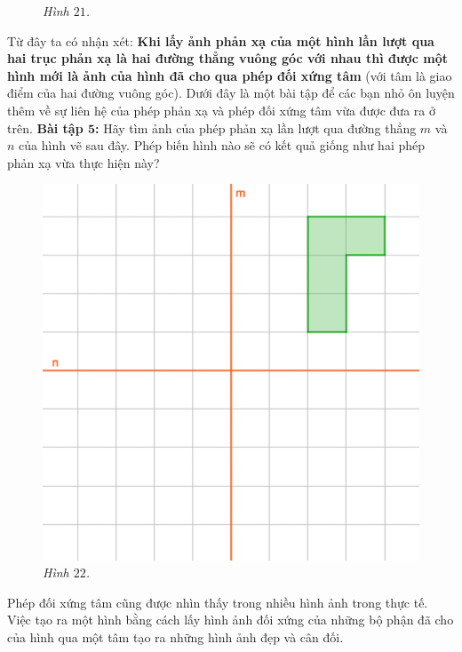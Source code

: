 \begin{multicols}{2}
\begin{figure}[H]
		\caption{\small\textit{\color{toancuabi}Hình $21$.}}
		\vspace*{-10pt}
	\end{figure}
	Từ đây ta có nhận xét: \textbf{\color{toancuabi}Khi lấy ảnh phản xạ của một hình lần lượt qua hai trục phản xạ là hai đường thẳng vuông góc với nhau thì được một hình mới là ảnh của hình đã cho qua phép đối xứng tâm} (với tâm là giao điểm của hai đường vuông góc).
	\vskip 0.1cm
	Dưới đây là một bài tập để các bạn nhỏ ôn luyện thêm về sự liên hệ của phép phản xạ và phép đối xứng tâm vừa được đưa ra ở trên.
	\vskip 0.1cm
	\textbf{\color{toancuabi}Bài tập $\pmb5$:} Hãy tìm ảnh của phép phản xạ lần lượt qua đường thẳng $m$ và $n$ của hình vẽ sau đây. Phép biến hình nào sẽ có kết quả giống như hai phép phản xạ vừa thực hiện này?
	\begin{figure}[H]
		\vspace*{5pt}
		\centering
		\captionsetup{labelformat= empty, justification=centering}
		\includegraphics[width= 1\linewidth]{21}
		\caption{\small\textit{\color{toancuabi}Hình $22$.}}
		\vspace*{-10pt}
	\end{figure}
	Phép đối xứng tâm cũng được nhìn thấy trong nhiều hình ảnh trong thực tế. Việc tạo ra một hình bằng cách lấy hình ảnh đối xứng của những bộ phận đã cho của hình qua một tâm tạo ra những hình ảnh đẹp và cân đối.

\end{multicols}
